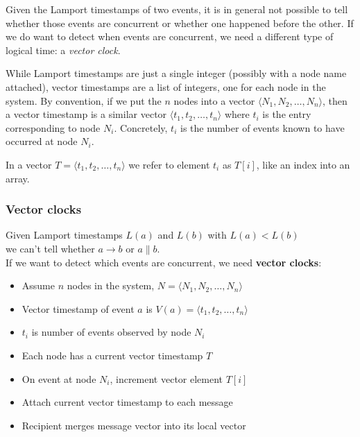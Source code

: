 Given the Lamport timestamps of two events, it is in general not possible to tell whether those events are concurrent or whether one happened before the other.
If we do want to detect when events are concurrent, we need a different type of logical time: a \emph{vector clock}.

While Lamport timestamps are just a single integer (possibly with a node name attached), vector timestamps are a list of integers, one for each node in the system.
By convention, if we put the $n$ nodes into a vector $\langle N_1, N_2, \dots, N_n \rangle$, then a vector timestamp is a similar vector $\langle t_1, t_2, \dots, t_n \rangle$ where $t_i$ is the entry corresponding to node $N_i$.
Concretely, $t_i$ is the number of events known to have occurred at node $N_i$.

In a vector $T = \langle t_1, t_2, \dots, t_n \rangle$ we refer to element $t_i$ as $T[i]$, like an index into an array.

\begin{frame}
    \label{s:vector-clocks}
    \frametitle{Vector clocks}
    Given Lamport timestamps $L(a)$ and $L(b)$ with $L(a) < L(b)$\\we can't tell whether $a \rightarrow b$ or $a \parallel b$.\\[1em]
    If we want to detect which events are concurrent, we need \textbf{vector clocks}:\pause
    \begin{itemize}
        \item Assume $n$ nodes in the system, $N = \langle N_1, N_2, \dots, N_n \rangle$\pause
        \item Vector timestamp of event $a$ is $V(a) = \langle t_1, t_2, \dots, t_n\rangle$
        \item $t_i$ is number of events observed by node $N_i$\pause
        \item Each node has a current vector timestamp $T$
        \item On event at node $N_i$, increment vector element $T[i]$\pause
        \item Attach current vector timestamp to each message
        \item Recipient merges message vector into its local vector
    \end{itemize}
\end{frame}
\label{l:vector-clocks}

